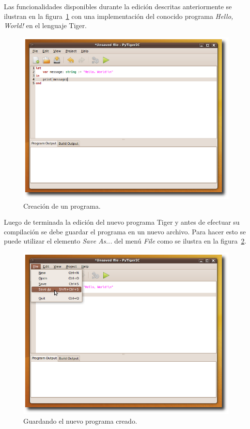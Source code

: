 \documentclass{article}
\begin{document}
\newpage

Las funcionalidades disponibles durante la edición descritas anteriormente se
ilustran en la figura~\ref{fig:2-editing} con una implementación del conocido
programa \emph{Hello, World!} en el lenguaje Tiger.

\begin{figure}[htb]
  \centering
  \includegraphics[width=5.5in]{gui/2-editing}
  \caption{Creación de un programa.}
  \label{fig:2-editing}
\end{figure}

\newpage

Luego de terminada la edición del nuevo programa Tiger y antes de efectuar
su compilación se debe guardar el programa en un nuevo archivo. Para hacer
esto se puede utilizar el elemento \emph{Save As...} del menú \emph{File}
como se ilustra en la figura~\ref{fig:3-saving-as}.

\begin{figure}[htb]
  \centering
  \includegraphics[width=5.5in]{gui/3-saving-as}
  \caption{Guardando el nuevo programa creado.}
  \label{fig:3-saving-as}
\end{figure}
\end{document}
